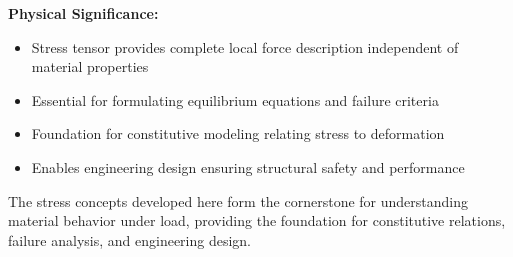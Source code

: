 \begin{subox}[Summary]
\textbf{Physical Significance:}
\begin{itemize}
\item Stress tensor provides complete local force description independent of material properties
\item Essential for formulating equilibrium equations and failure criteria
\item Foundation for constitutive modeling relating stress to deformation
\item Enables engineering design ensuring structural safety and performance
\end{itemize}

The stress concepts developed here form the cornerstone for understanding material behavior under load, providing the foundation for constitutive relations, failure analysis, and engineering design.
\end{subox}